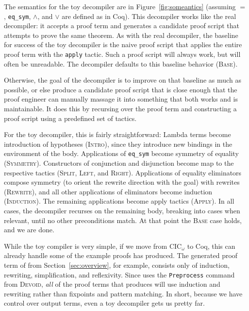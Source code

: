The semantics for the toy decompiler are in Figure~\ref{fig:someantics} (assuming $=$, \lstinline{eq_sym}, $\wedge$, and $\vee$ are defined as in Coq).
This decompiler works like the real decompiler: it accepts a proof term and generates a candidate proof script that attempts to prove the same theorem.
As with the real decompiler, the baseline for success of the toy decompiler is the naive proof script
that applies the entire proof term with the \lstinline{apply} tactic.
Such a proof script will always work, but will often be unreadable.
The decompiler defaults to this baseline behavior (\textsc{Base}).

Otherwise, the goal of the decompiler is to improve on that baseline as much as possible,
or else produce a candidate proof script that is close enough that the proof engineer can manually massage it into something that
both works and is maintainable.
It does this by recursing over the proof term and constructing a proof script using a predefined set of tactics.

For the toy decompiler, this is fairly straightforward: Lambda terms become introduction of hypotheses (\textsc{Intro}), since they introduce new bindings
in the environment of the body. Applications of \lstinline{eq_sym} become symmetry of equality (\textsc{Symmetry}).
Constructors of conjunction and disjunction become map to the respective tactics (\textsc{Split}, \textsc{Left}, and \textsc{Right}).
Applications of equality eliminators compose symmetry (to orient the rewrite direction with the goal) with rewrites (\textsc{Rewrite}),
and all other applications of eliminators become induction (\textsc{Induction}).
The remaining applications become apply tactics (\textsc{Apply}).
In all cases, the decompiler recurses on the remaining body, breaking into cases when relevant, until no other preconditions match.
At that point the \textsc{Base} case holds, and we are done.

While the toy compiler is very simple, if we move from CIC$_{\omega}$ to Coq,
this can already handle some of the example proofs \toolname has produced.
The generated proof term of  from Section~\ref{sec:overview},
for example, consists only of induction, rewriting, simplification, and reflexivity.
Since \toolname uses the \lstinline{Preprocess} command from \textsc{Devoid}, \textit{all} of the proof terms that \toolname
produces will use induction and rewriting rather than fixpoints and pattern matching.
In short, because we have control over output terms, even a toy decompiler gets us pretty far.

